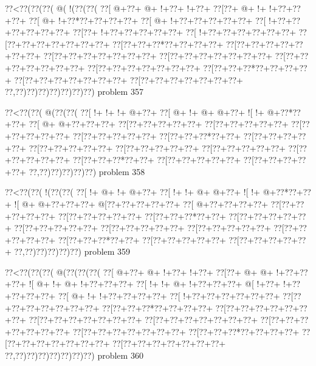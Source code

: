 \vbox{\vbox{\goo
\0??<\0??(\0??(\0??(\- @(\- !(\0??(\0??(
\0??[\- @+\0??+\- @+\- !+\0??+\- !+\0??+
\0??[\0??+\- @+\- !+\- !+\0??+\0??+\0??+
\0??[\- @+\- !+\0??*\0??+\0??+\0??+\0??+
\0??[\- @+\- !+\0??+\0??+\0??+\0??+\0??+
\0??[\- !+\0??+\0??+\0??+\0??+\0??+\0??+
\0??[\0??+\- !+\0??+\0??+\0??+\0??+\0??+
\0??[\- !+\0??+\0??+\0??+\0??+\0??+\0??+
\0??[\0??+\0??+\0??+\0??+\0??+\0??+\0??+
\0??[\0??+\0??+\0??*\0??+\0??+\0??+\0??+
\0??[\0??+\0??+\0??+\0??+\0??+\0??+\0??+
\0??[\0??+\0??+\0??+\0??+\0??+\0??+\0??+
\0??[\0??+\0??+\0??+\0??+\0??+\0??+\0??+
\0??[\0??+\0??+\0??+\0??+\0??+\0??+\0??+
\0??[\0??+\0??+\0??+\0??+\0??+\0??+\0??+
\0??[\0??+\0??+\0??*\0??+\0??+\0??+\0??+
\0??[\0??+\0??+\0??+\0??+\0??+\0??+\0??+
\0??[\0??+\0??+\0??+\0??+\0??+\0??+\0??+
\0??,\0??)\0??)\0??)\0??)\0??)\0??)\0??)
}
\hfil problem 357\hfil\break
}

\vbox{\vbox{\goo
\0??<\0??(\0??(\- @(\0??(\0??(
\0??[\- !+\- !+\- !+\- @+\0??+
\0??[\- @+\- !+\- @+\- @+\0??+
\- ![\- !+\- @+\0??*\0??+\0??+
\0??[\- @+\- @+\0??+\0??+\0??+
\0??[\0??+\0??+\0??+\0??+\0??+
\0??[\0??+\0??+\0??+\0??+\0??+
\0??[\0??+\0??+\0??+\0??+\0??+
\0??[\0??+\0??+\0??+\0??+\0??+
\0??[\0??+\0??+\0??*\0??+\0??+
\0??[\0??+\0??+\0??+\0??+\0??+
\0??[\0??+\0??+\0??+\0??+\0??+
\0??[\0??+\0??+\0??+\0??+\0??+
\0??[\0??+\0??+\0??+\0??+\0??+
\0??[\0??+\0??+\0??+\0??+\0??+
\0??[\0??+\0??+\0??*\0??+\0??+
\0??[\0??+\0??+\0??+\0??+\0??+
\0??[\0??+\0??+\0??+\0??+\0??+
\0??,\0??)\0??)\0??)\0??)\0??)
}
\hfil problem 358\hfil\break
}

\vbox{\vbox{\goo
\0??<\0??(\0??(\- !(\0??(\0??(
\0??[\- !+\- @+\- !+\- @+\0??+
\0??[\- !+\- !+\- @+\- @+\0??+
\- ![\- !+\- @+\0??*\0??+\0??+
\- ![\- @+\- @+\0??+\0??+\0??+
\- @[\0??+\0??+\0??+\0??+\0??+
\0??[\- @+\0??+\0??+\0??+\0??+
\0??[\0??+\0??+\0??+\0??+\0??+
\0??[\0??+\0??+\0??+\0??+\0??+
\0??[\0??+\0??+\0??*\0??+\0??+
\0??[\0??+\0??+\0??+\0??+\0??+
\0??[\0??+\0??+\0??+\0??+\0??+
\0??[\0??+\0??+\0??+\0??+\0??+
\0??[\0??+\0??+\0??+\0??+\0??+
\0??[\0??+\0??+\0??+\0??+\0??+
\0??[\0??+\0??+\0??*\0??+\0??+
\0??[\0??+\0??+\0??+\0??+\0??+
\0??[\0??+\0??+\0??+\0??+\0??+
\0??,\0??)\0??)\0??)\0??)\0??)
}
\hfil problem 359\hfil\break
}

\vbox{\vbox{\goo
\0??<\0??(\0??(\0??(\- @(\0??(\0??(\0??(
\0??[\- @+\0??+\- @+\- !+\0??+\- !+\0??+
\0??[\0??+\- @+\- @+\- !+\0??+\0??+\0??+
\- ![\- @+\- !+\- @+\- !+\0??+\0??+\0??+
\0??[\- !+\- !+\- @+\- !+\0??+\0??+\0??+
\- @[\- !+\0??+\- !+\0??+\0??+\0??+\0??+
\0??[\- @+\- !+\- !+\0??+\0??+\0??+\0??+
\0??[\- !+\0??+\0??+\0??+\0??+\0??+\0??+
\0??[\0??+\0??+\0??+\0??+\0??+\0??+\0??+
\0??[\0??+\0??+\0??*\0??+\0??+\0??+\0??+
\0??[\0??+\0??+\0??+\0??+\0??+\0??+\0??+
\0??[\0??+\0??+\0??+\0??+\0??+\0??+\0??+
\0??[\0??+\0??+\0??+\0??+\0??+\0??+\0??+
\0??[\0??+\0??+\0??+\0??+\0??+\0??+\0??+
\0??[\0??+\0??+\0??+\0??+\0??+\0??+\0??+
\0??[\0??+\0??+\0??*\0??+\0??+\0??+\0??+
\0??[\0??+\0??+\0??+\0??+\0??+\0??+\0??+
\0??[\0??+\0??+\0??+\0??+\0??+\0??+\0??+
\0??,\0??)\0??)\0??)\0??)\0??)\0??)\0??)
}
\hfil problem 360\hfil\break
}

